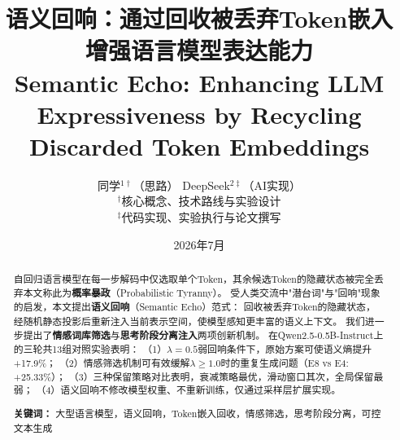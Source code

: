 \documentclass[a4paper, 11pt]{article}
\begin{document}
\title{\vspace{-1.2cm}
  \LARGE \textbf{语义回响：通过回收被丢弃Token嵌入\\增强语言模型表达能力}\\
  \large \textbf{Semantic Echo: Enhancing LLM Expressiveness by Recycling Discarded Token Embeddings}
  \vspace{-0.3cm}}
\author{
  同学${}^{1\dagger}$（思路）\qquad
  DeepSeek${}^{2\ddagger}$（AI实现）\\[4pt]
  \small${}^\dagger$核心概念、技术路线与实验设计 \\
  \small${}^\ddagger$代码实现、实验执行与论文撰写}
\date{\small 2026年7月}
\maketitle
\thispagestyle{empty}

\begin{abstract}
\noindent 自回归语言模型在每一步解码中仅选取单个Token，其余候选Token的隐藏状态被完全丢弃本文称此为\textbf{概率暴政}（Probabilistic Tyranny）。
受人类交流中"潜台词"与"回响"现象的启发，本文提出\textbf{语义回响}（Semantic Echo）范式：
回收被丢弃Token的隐藏状态，经随机静态投影后重新注入当前表示空间，使模型感知更丰富的语义上下文。
我们进一步提出了\textbf{情感词库筛选}与\textbf{思考阶段分离注入}两项创新机制。
在Qwen2.5-0.5B-Instruct上的三轮共13组对照实验表明：
（1）$\lambda=0.5$弱回响条件下，原始方案可使语义熵提升+17.9\%；
（2）情感筛选机制可有效缓解$\lambda\geq1.0$时的重复生成问题（E8 vs E4: +25.33\%）；
（3）三种保留策略对比表明，衰减策略最优，滑动窗口其次，全局保留最弱；
（4）语义回响不修改模型权重、不重新训练，仅通过采样层扩展实现。

\vspace{0.3cm}
\noindent \textbf{关键词：} 大型语言模型，语义回响，Token嵌入回收，情感筛选，思考阶段分离，可控文本生成
\end{abstract}
\end{document}
